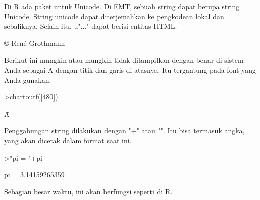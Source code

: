 \documentclass[a4paper,10pt]{article}
\begin{document}
\begin{eulernotebook}
\begin{eulercomment}
\begin{eulercomment}
\begin{eulercomment}
\begin{eulercomment}
\begin{eulercomment}
\begin{eulercomment}
\begin{eulercomment}
\begin{eulercomment}
\begin{eulercomment}
\begin{eulercomment}
\begin{eulercomment}
\begin{eulercomment}
\begin{eulercomment}
\begin{eulercomment}
\begin{eulercomment}
\begin{eulercomment}
\begin{eulercomment}
\begin{eulercomment}
\begin{eulercomment}
Di R ada paket untuk Unicode. Di EMT, sebuah string dapat berupa
string Unicode. String unicode dapat diterjemahkan ke pengkodean lokal
dan sebaliknya. Selain itu, u"..." dapat berisi entitas HTML.
\end{eulercomment}
\begin{euleroutput}
  © René Grothmann
\end{euleroutput}
\begin{eulercomment}
Berikut ini mungkin atau mungkin tidak ditampilkan dengan benar di
sistem Anda sebagai A dengan titik dan garis di atasnya. Itu
tergantung pada font yang Anda gunakan.
\end{eulercomment}
\begin{eulerprompt}
>chartoutf([480])
\end{eulerprompt}
\begin{euleroutput}
  Ǡ
\end{euleroutput}
\begin{eulercomment}
Penggabungan string dilakukan dengan "+" atau "\textbar{}". Itu bisa termasuk
angka, yang akan dicetak dalam format saat ini.
\end{eulercomment}
\begin{eulerprompt}
>"pi = "+pi
\end{eulerprompt}
\begin{euleroutput}
  pi = 3.14159265359
\end{euleroutput}
\begin{eulercomment}
Sebagian besar waktu, ini akan berfungsi seperti di R.


\end{eulercomment}
\end{eulercomment}
\end{eulercomment}
\end{eulercomment}
\end{eulercomment}
\end{eulercomment}
\end{eulercomment}
\end{eulercomment}
\end{eulercomment}
\end{eulercomment}
\end{eulercomment}
\end{eulercomment}
\end{eulercomment}
\end{eulercomment}
\end{eulercomment}
\end{eulercomment}
\end{eulercomment}
\end{eulercomment}
\end{eulercomment}
\end{eulernotebook}
\end{document}
